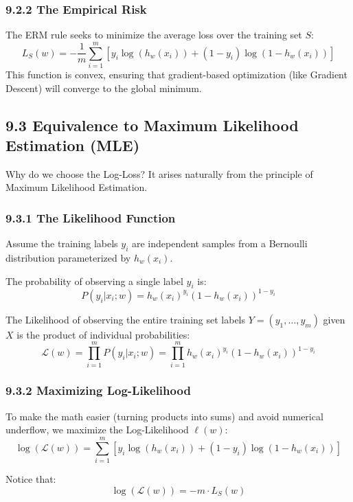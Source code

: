 \documentclass[
  italian,
  11pt,
]{article}
\begin{document}
\subsubsection{9.2.2 The Empirical Risk}\label{the-empirical-risk}

The ERM rule seeks to minimize the average loss over the training set
\(S\):
\[L_S(w) = -\frac{1}{m} \sum_{i=1}^{m} \left[ y_i \log(h_w(x_i)) + (1-y_i) \log(1 - h_w(x_i)) \right]\]
This function is convex, ensuring that gradient-based optimization (like
Gradient Descent) will converge to the global minimum.

\subsection{9.3 Equivalence to Maximum Likelihood Estimation
(MLE)}\label{equivalence-to-maximum-likelihood-estimation-mle}

Why do we choose the Log-Loss? It arises naturally from the principle of
Maximum Likelihood Estimation.

\subsubsection{9.3.1 The Likelihood
Function}\label{the-likelihood-function}

Assume the training labels \(y_i\) are independent samples from a
Bernoulli distribution parameterized by \(h_w(x_i)\).

The probability of observing a single label \(y_i\) is:
\[P(y_i | x_i; w) = h_w(x_i)^{y_i} (1 - h_w(x_i))^{1 - y_i}\]

The Likelihood of observing the entire training set labels
\(Y = (y_1, \dots, y_m)\) given \(X\) is the product of individual
probabilities:
\[\mathcal{L}(w) = \prod_{i=1}^{m} P(y_i | x_i; w) = \prod_{i=1}^{m} h_w(x_i)^{y_i} (1 - h_w(x_i))^{1 - y_i}\]

\subsubsection{9.3.2 Maximizing
Log-Likelihood}\label{maximizing-log-likelihood}

To make the math easier (turning products into sums) and avoid numerical
underflow, we maximize the Log-Likelihood \(\ell(w)\):
\[\log(\mathcal{L}(w)) = \sum_{i=1}^{m} \left[ y_i \log(h_w(x_i)) + (1-y_i) \log(1 - h_w(x_i)) \right]\]

Notice that: \[\log(\mathcal{L}(w)) = -m \cdot L_S(w)\]
\end{document}
